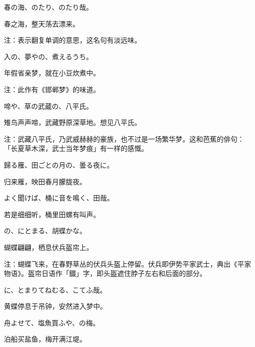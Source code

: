 \begin{haiku}
    {\FH 春の海、のたり、のたり哉。}

    {\FK 春之海，整天荡去漂来。}

    {\FT 注：表示翻复单调的意思，这名句有淡远味。}
\end{haiku}

\begin{haiku}
    {\FH {}入の、夢やの、煮えるうち。}

    {\FK 年假省亲梦，就在小豆炊煮中。}

    {\FT 注：此作有《邯郸梦》的味道。}
\end{haiku}

\begin{haiku}
    {\FH {}啼や、草の武蔵の、八平氏。}

    {\FK 雉鸟声声啼，武藏野原深草地。想见八平氏。}

    {\FT 注：武藏八平氏，乃武威赫赫的豪族，也不过是一场繁华梦。这和芭蕉的俳句：「长夏草木深，武士当年梦痕」有一样的感慨。}
\end{haiku}

\begin{haiku}
    {\FH 歸る雁、田ごとの月の、曇る夜に。}

    {\FK 归来雁，映田春月朦胧夜。}
\end{haiku}

\begin{haiku}
    {\FH よく聞けば、桶に音を鳴く、田哉。}

    {\FK 若是细细听，桶里田螺有叫声。}
\end{haiku}

\begin{haiku}
    {\FH {}の、にとまる、胡蝶かな。}

    {\FK 蝴蝶翩翩，栖息伏兵盔帘上。}

    {\FT 注：蝴蝶飞来，在春野草丛的伏兵头盔上停留。伏兵即伊势平家武士，典出《平家物语》。盔帘日语作「錣」字，即头盔遮住脖子左右和后面的部分。}
\end{haiku}

\begin{haiku}
    {\FH {}に、とまりてねむる、こてふ哉。}

    {\FK 黄蝶停息于吊钟，安然进入梦中。}
\end{haiku}

\begin{haiku}
    {\FH 舟よせて、塩魚買ふや、の梅。}

    {\FK 泊船买盐鱼，梅开满江堤。}
\end{haiku}

